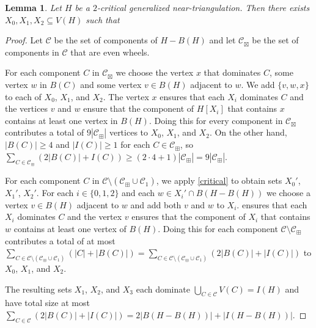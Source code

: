 \documentclass[12pt]{article}
\newtheorem{lem}{Lemma}
\theoremstyle{definition}
\begin{document}
\begin{lem}\label{three_sets_coverage}
  Let $H$ be a $2$-critical generalized near-triangulation.  Then there exists $X_0,X_1,X_2\subseteq V(H)$ such that
\end{lem}

\begin{proof}
  Let $\mathcal{C}$ be the set of components of $H-B(H)$
  and let $\mathcal{C}_{\boxtimes}$ be the set of components in $\mathcal{C}$  that are even wheels.

  For each component $C$ in $\mathcal{C}_{\boxtimes}$ we choose the vertex $x$ that dominates $C$, some vertex $w$ in $B(C)$ and some vertex $v\in B(H)$ adjacent to $w$.  We add $\{v,w,x\}$ to each of $X_0$, $X_1$, and $X_2$. The vertex $x$ ensures that each $X_i$ dominates $C$ and the vertices $v$ and $w$ ensure that the component of $H[X_i]$ that contains $x$ contains at least one vertex in $B(H)$.  Doing this for every component in $\mathcal{C}_{\boxtimes}$ contributes a total of $9|\mathcal{C}_{\boxplus}|$ vertices to $X_0$, $X_1$, and $X_2$. On the other hand, $|B(C)|\ge 4$ and $|I(C)|\ge 1$ for each $C\in \mathcal{C}_{\boxplus}$, so $\sum_{C\in \mathcal{C}_{\boxplus}} (2|B(C)| + I(C))\ge (2\cdot 4+1)|\mathcal{C}_{\boxplus}| = 9|\mathcal{C}_{\boxplus}|$.

  For each component $C$ in $\mathcal{C}\setminus(\mathcal{C}_{\boxplus}\cup\mathcal{C}_1)$, we apply \cref{critical} to obtain sets $X_0'$, $X_1'$, $X_2'$. For each $i\in\{0,1,2\}$ and each $w\in X_i'\cap B(H-B(H))$ we choose a vertex $v\in B(H)$ adjacent to $w$ and add both $v$ and $w$ to $X_i$.  ensures that each $X_i$ dominates $C$ and the vertex $v$ ensures that the component of $X_i$ that contains $w$ contains at least one vertex of $B(H)$.
  Doing this for each component $\mathcal{C}\setminus\mathcal{C}_\boxplus$ contributes a total of at most  $\sum_{C\in\mathcal{C}\setminus(\mathcal{C}_{\boxplus}\cup\mathcal{C}_1)}(|C|+|B(C)|)=\sum_{C\in\mathcal{C}\setminus(\mathcal{C}_{\boxplus}\cup\mathcal{C}_1)}(2|B(C)|+|I(C)|)$ to $X_0$, $X_1$, and $X_2$.

  The resulting sets $X_1$, $X_2$, and $X_3$ each dominate $\bigcup_{C\in\mathcal{C}} V(C)=I(H)$ and have total size at most $\sum_{C\in\mathcal{C}} (2|B(C)|+|I(C)|) = 2|B(H-B(H))| + |I(H-B(H))|$.
\end{proof}
\end{document}
